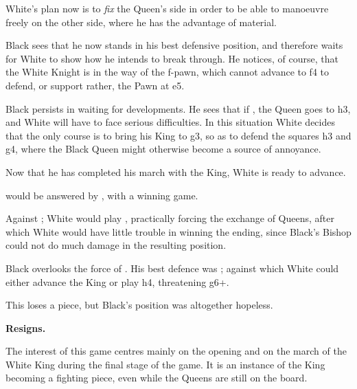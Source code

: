 \documentclass[10pt,twoside]{article}
\begin{document}
White's plan now is to \emph{fix} the Queen's side in order to be able to manoeuvre freely on the other side, where he has the advantage of material.


\board

Black sees that he now stands in his best defensive position, and therefore waits for White to show how he intends to break through. He notices, of course, that the White Knight is in the way of the f-pawn, which cannot advance to f4 to defend, or support rather, the Pawn at e5.


\board

Black persists in waiting for developments. He sees that if , the Queen goes to h3, and White will have to face serious difficulties. In this situation White decides that the only course is to bring his King to g3, so as to defend the squares h3 and g4, where the Black Queen might otherwise become a source of annoyance.


Now that he has completed his march with the King, White is ready to advance.

\board


 would be answered by , with a winning game.


Against ; White would play , practically forcing the exchange of Queens, after which White would have little trouble in winning the ending, since Black's Bishop could not do much damage in the resulting position.


Black overlooks the force of . His best defence was ; against which White could either advance the King or play \figN h4, threatening \figN g6+.


This loses a piece, but Black's position was altogether hopeless.


\noindent\textbf{Resigns.}

The interest of this game centres mainly on the opening and on the march of the White King during the final stage of the game. It is an instance of the King becoming a fighting piece, even while the Queens are still on the board.
\end{document}

